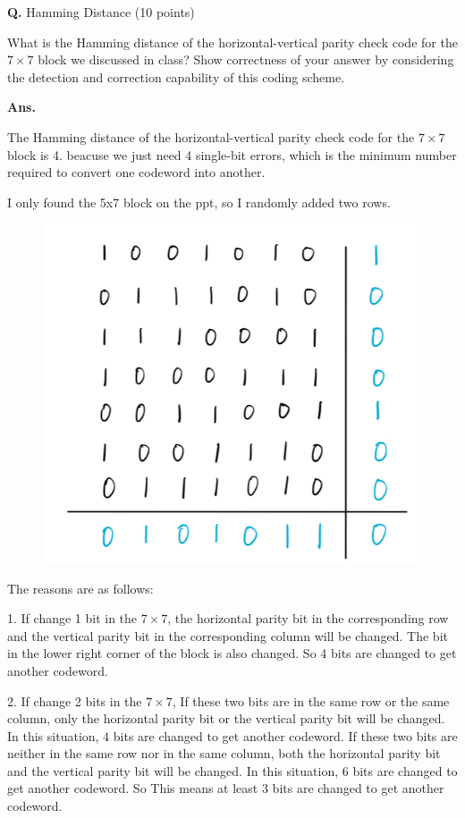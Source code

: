 \documentclass[12pt, a4paper, UTF8, fontset=windows]{ctexbook}
\newcounter{problemname}
\newenvironment{problem}{\begin{shaded}\stepcounter{problemname}\par\noindent\textbf{Q\arabic{problemname}.}}{\end{shaded}\par}
\newenvironment{solution}{\par\noindent\textbf{Ans.}}{\par}
\begin{document}
\begin{problem}
    Hamming Distance (10 points)

    What is the Hamming distance of the horizontal-vertical parity check code for the $7 \times 7$
    block we discussed in class? Show correctness of your answer by considering the detection
    and correction capability of this coding scheme.
\end{problem}

\begin{solution}

    The Hamming distance of the horizontal-vertical parity check code for the $7 \times 7$ block is 4. 
    beacuse we just need 4 single-bit errors, which is the minimum number required to convert one codeword into another.

    I only found the 5x7 block on the ppt, so I randomly added two rows.
    \begin{figure}[H]
        \centering
        \includegraphics[width=0.6\linewidth]{../src/Q7-1.jpg}  %
        \label{fig:7_1}
    \end{figure}

    The reasons are as follows:

    1. If change 1 bit in the $7 \times 7$, the horizontal parity bit in the corresponding row and the vertical parity bit
    in the corresponding column will be changed. The bit in the lower right corner of the block is also changed. So 4 bits are changed to get another codeword.

    2. If change 2 bits in the $7 \times 7$, If these two bits are in the same row or the same column, only the horizontal parity bit 
    or the vertical parity bit will be changed. In this situation, 4 bits are changed to get another codeword.
    If these two bits are neither in the same row nor in the same column, both the horizontal parity bit and the vertical parity bit will be changed.
    In this situation, 6 bits are changed to get another codeword. So This means at least 3 bits are changed to get another codeword.


\end{solution}
\end{document}
